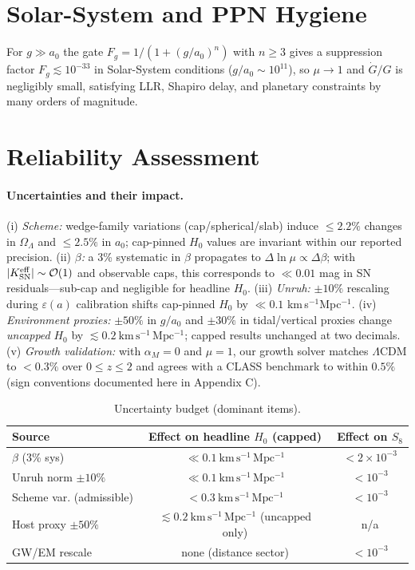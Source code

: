 \documentclass[aps,prd,onecolumn,notitlepage,superscriptaddress,nofootinbib]{revtex4-2}
\newcommand{\OL}{\Omega_{\Lambda}}
\newcommand{\alpham}{\alpha_M}
\newcommand{\Hzero}{H_0}
\newcommand{\eps}{\varepsilon}
\begin{document}
\section{Solar-System and PPN Hygiene}
For \(g\gg a_0\) the gate \(F_g=1/(1+(g/a_0)^n)\) with \(n\ge 3\) gives a suppression factor \(F_g\lesssim 10^{-33}\) in Solar-System conditions (\(g/a_0\sim 10^{11}\)), so \(\mu\to 1\) and \(\dot G/G\) is negligibly small, satisfying LLR, Shapiro delay, and planetary constraints by many orders of magnitude.

\section{Reliability Assessment}
\paragraph*{Uncertainties and their impact.}
(i) \emph{Scheme:} wedge-family variations (cap/spherical/slab) induce \(\le 2.2\%\) changes in \(\OL\) and \(\le 2.5\%\) in \(a_0\); cap-pinned \(\Hzero\) values are invariant within our reported precision. (ii) \emph{\(\beta\):} a 3\% systematic in \(\beta\) propagates to \(\Delta\ln\mu\propto \Delta\beta\); with \(|K_{\rm SN}^{\rm eff}|\sim \mathcal{O}(1)\) and observable caps, this corresponds to \(\ll 0.01\) mag in SN residuals—sub-cap and negligible for headline \(\Hzero\). (iii) \emph{Unruh:} \(\pm 10\%\) rescaling during \(\eps(a)\) calibration shifts cap-pinned \(\Hzero\) by \(\ll 0.1\) km\,s\(^{-1}\)Mpc\(^{-1}\). (iv) \emph{Environment proxies:} \(\pm 50\%\) in \(g/a_0\) and \(\pm 30\%\) in tidal/vertical proxies change \emph{uncapped} \(\Hzero\) by \(\lesssim 0.2\ \mathrm{km\,s^{-1}\,Mpc^{-1}}\); capped results unchanged at two decimals. (v) \emph{Growth validation:} with \(\alpham=0\) and \(\mu=1\), our growth solver matches \(\Lambda\)CDM to \(<0.3\%\) over \(0\le z\le 2\) and agrees with a CLASS benchmark to within \(0.5\%\) (sign conventions documented here in Appendix C).

\begin{table}[H]
\centering
\caption{Uncertainty budget (dominant items).}
\begin{tabular}{lcc}
\toprule
Source & Effect on headline \(H_0\) (capped) & Effect on \(S_8\) \\
\midrule
\(\beta\) (3\% sys) & \(\ll 0.1\ \mathrm{km\,s^{-1}\,Mpc^{-1}}\) & \(< 2\times 10^{-3}\) \\
Unruh norm \(\pm 10\%\) & \(\ll 0.1\ \mathrm{km\,s^{-1}\,Mpc^{-1}}\) & \(< 10^{-3}\) \\
Scheme var. (admissible) & \(< 0.3\ \mathrm{km\,s^{-1}\,Mpc^{-1}}\) & \(< 10^{-3}\) \\
Host proxy \(\pm 50\%\) & \(\lesssim 0.2\ \mathrm{km\,s^{-1}\,Mpc^{-1}}\) (uncapped only) & n/a \\
GW/EM rescale & none (distance sector) & \(< 10^{-3}\) \\
\bottomrule
\end{tabular}
\end{table}
\end{document}
